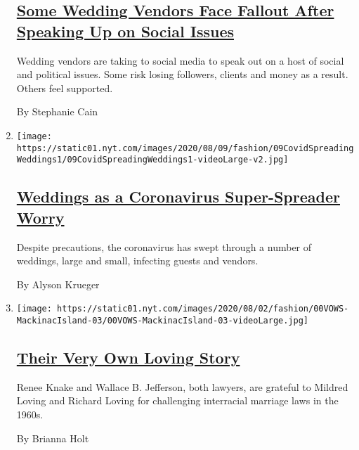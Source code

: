 \begin{enumerate}
{  \subsection{\texorpdfstring{\href{/2020/08/06/fashion/weddings/wedding-vendors-social-issues.html}{Some
  Wedding Vendors Face Fallout After Speaking Up on Social
  Issues}}{Some Wedding Vendors Face Fallout After Speaking Up on Social Issues}}\label{some-wedding-vendors-face-fallout-after-speaking-up-on-social-issues}}

  Wedding vendors are taking to social media to speak out on a host of
  social and political issues. Some risk losing followers, clients and
  money as a result. Others feel supported.

  By Stephanie Cain
\item
  \texttt{[image: https://static01.nyt.com/images/2020/08/09/fashion/09CovidSpreadingWeddings1/09CovidSpreadingWeddings1-videoLarge-v2.jpg]}

  \hypertarget{weddings-as-a-coronavirus-super-spreader-worry}{%
  \subsection{\texorpdfstring{\href{/2020/08/04/fashion/weddings/weddings-as-covid-super-spreaders.html}{Weddings
  as a Coronavirus Super-Spreader
  Worry}}{Weddings as a Coronavirus Super-Spreader Worry}}\label{weddings-as-a-coronavirus-super-spreader-worry}}

  Despite precautions, the coronavirus has swept through a number of
  weddings, large and small, infecting guests and vendors.

  By Alyson Krueger
\item
  \texttt{[image: https://static01.nyt.com/images/2020/08/02/fashion/00VOWS-MackinacIsland-03/00VOWS-MackinacIsland-03-videoLarge.jpg]}

  \hypertarget{their-very-own-loving-story}{%
  \subsection{\texorpdfstring{\href{/2020/07/31/fashion/weddings/Renee-Knake-and-Wallace-Jefferson-wed-tribute-to-Lovings-before-them.html}{Their
  Very Own Loving
  Story}}{Their Very Own Loving Story}}\label{their-very-own-loving-story}}

  Renee Knake and Wallace B. Jefferson, both lawyers, are grateful to
  Mildred Loving and Richard Loving for challenging interracial marriage
  laws in the 1960s.

  By Brianna Holt
\end{enumerate}

